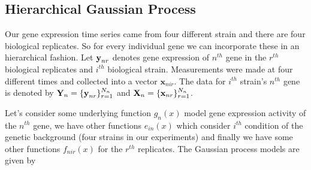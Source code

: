 
\subsection{Hierarchical Gaussian Process}
Our gene expression time series came from four different strain and there are four biological replicates. So for every individual gene we can incorporate these in an hierarchical fashion. Let ${\textbf y}_{nr}$ denotes gene expression of $n^{th}$ gene in the $r^{th}$ biological replicates and $i^{th}$ biological strain. Measurements were made at four different times and collected into a vector $\textbf{x}_{nir}$. The data for $i^{th}$ strain's $n^{th}$ gene is denoted by ${\textbf Y}_n = \{{\textbf y}_{nr}\}^{N_n}_{r=1}$ and ${\textbf X}_n = \{{\textbf x}_{nr}\}^{N_n}_{r=1}$.

Let's consider some underlying function $g_n\left(x\right)$ model gene expression activity of the $n^{th}$ gene, we have other functions $e_{in}\left(x\right)$ which consider $i^{th}$ condition of the genetic background (four strains in our experiments) and finally we have some other functions $f_{nir}\left(x\right)$ for the $r^{th}$ replicates. The Gaussian process models are given by

